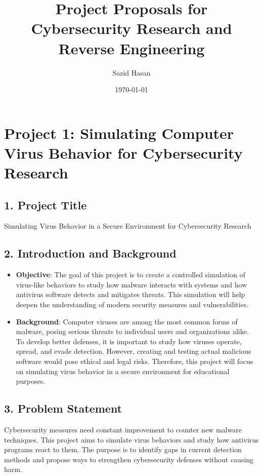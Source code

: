 \documentclass{article}
\title{Project Proposals for Cybersecurity Research and Reverse Engineering}
\author{Sazid Hasan}
\date{\today}
\begin{document}
\maketitle

\section*{Project 1: Simulating Computer Virus Behavior for Cybersecurity Research}

\subsection*{1. Project Title}
Simulating Virus Behavior in a Secure Environment for Cybersecurity Research

\subsection*{2. Introduction and Background}
\begin{itemize}
    \item \textbf{Objective}: The goal of this project is to create a controlled simulation of virus-like behaviors to study how malware interacts with systems and how antivirus software detects and mitigates threats. This simulation will help deepen the understanding of modern security measures and vulnerabilities.
    \item \textbf{Background}: Computer viruses are among the most common forms of malware, posing serious threats to individual users and organizations alike. To develop better defenses, it is important to study how viruses operate, spread, and evade detection. However, creating and testing actual malicious software would pose ethical and legal risks. Therefore, this project will focus on simulating virus behavior in a secure environment for educational purposes.
\end{itemize}

\subsection*{3. Problem Statement}
Cybersecurity measures need constant improvement to counter new malware techniques. This project aims to simulate virus behaviors and study how antivirus programs react to them. The purpose is to identify gaps in current detection methods and propose ways to strengthen cybersecurity defenses without causing harm.
\end{document}
